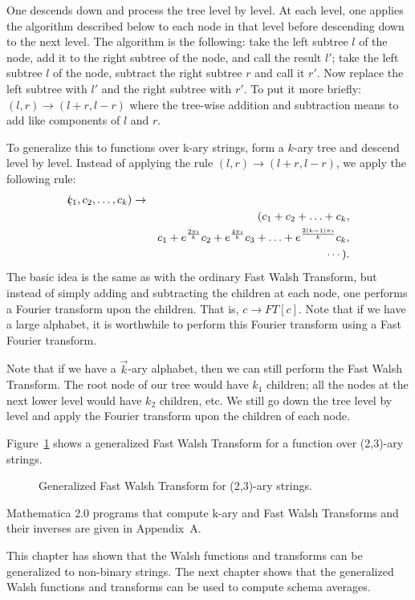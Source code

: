 One descends down and process the tree level by level.  At each level,
one applies the algorithm described below to each node in that level before
descending down to the next level.  The algorithm is the following:
take the left subtree $l$ of the node, add it to the right subtree
of the node, and call the result $l'$; take the left subtree $l$ of
the node, subtract the right subtree $r$  and call it $r'$.  Now replace
the left subtree with $l'$ and the right subtree with $r'$.
To put it more briefly: $(l,r) \rightarrow (l + r,l - r)$ where the tree-wise
addition and subtraction means to add like components of $l$ and $r$.

To generalize this to functions over  k-ary strings, form a $k$-ary
tree and descend level by level.  Instead of applying the rule
$(l,r) \rightarrow (l+r,l-r)$, we apply the following rule:
\begin{eqnarray}
\lefteqn (c_1,c_2,\ldots,c_k) &\rightarrow& \nonumber \\
& &(c_1+c_2+\ldots+c_k,\nonumber \\
& &c_1+e^{\frac{2 \pi \imath}{k}} c_2 + e^\frac{4 \pi \imath}{k} c_3 + \ldots 
	+ e^\frac{2 (k-1) \pi \imath}{k} c_k, \nonumber \\
& &\cdots).
\end{eqnarray}
The basic idea is the same as with the ordinary Fast Walsh Transform, but
instead of simply adding and subtracting the children at each node, one performs
a Fourier transform upon the children.
That is, $c \rightarrow FT[c]$.  Note that if we have a large alphabet,
it is worthwhile to perform this Fourier transform using a Fast Fourier
transform.

Note that if we have a $\vec{k}$-ary alphabet, then we can still perform
the Fast Walsh Transform.  The root node of our tree would have $k_1$
children; all the nodes at the next lower level would have $k_2$ children,
etc.  We still go down the tree level by level and apply the Fourier
transform upon the children of each node.

\begin{example} Figure~\ref{gfwt} shows a generalized Fast Walsh Transform
for a function over (2,3)-ary strings.
\begin{figure}
\caption{Generalized Fast Walsh Transform for (2,3)-ary strings.}
\label{gfwt}
\end{figure}
\end{example}

Mathematica 2.0 programs that compute k-ary and \veckary Fast Walsh Transforms
and their inverses are given in Appendix~A.

  This chapter has shown that the Walsh functions and transforms can be
generalized to non-binary strings.  The next chapter shows that the
generalized Walsh functions and transforms can be used to compute
schema averages.


